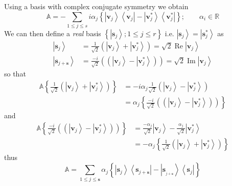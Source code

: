 \documentclass[aps,preprint]{revtex4}%
\begin{document}
Using a basis with complex conjugate symmetry we obtain
\begin{equation}
\mathbb{A}=-\sum_{1\leq j\leq s}i\alpha_{j}\left\{  \left\vert \mathbf{v}%
_{j}\right\rangle \left\langle \mathbf{v}_{j}\right\vert -\left\vert
\mathbf{v}_{j}^{\ast}\right\rangle \left\langle \mathbf{v}_{j}^{\ast
}\right\vert \right\}  ;\qquad\alpha_{i}\in\mathbb{R}%
\end{equation}
We can then define a \emph{real} basis $\left\{  \left\vert \mathbf{s}%
_{j}\right\rangle ;1\leq j\leq r\right\}  $ i.e. $\left\vert \mathbf{s}%
_{j}\right\rangle =\left\vert \mathbf{s}_{j}^{\ast}\right\rangle $ as
\begin{align}
\left\vert \mathbf{s}_{j}\right\rangle  &  =\frac{1}{\sqrt{2}}\left(
\left\vert \mathbf{v}_{j}\right\rangle +\left\vert \mathbf{v}_{j}^{\ast
}\right\rangle \right)  =\sqrt{2}\operatorname{Re}\left\vert \mathbf{v}%
_{j}\right\rangle \nonumber\\
\left\vert \mathbf{s}_{j+\mathbf{s}}\right\rangle  &  =\frac{-i}{\sqrt{2}%
}\left(  \left(  \left\vert \mathbf{v}_{j}\right\rangle -\left\vert
\mathbf{v}_{j}^{\ast}\right\rangle \right)  \right)  =\sqrt{2}%
\operatorname{Im}\left\vert \mathbf{v}_{j}\right\rangle
\end{align}
so that
\begin{align}
\mathbb{A}\left\{  \frac{1}{\sqrt{2}}\left(  \left\vert \mathbf{v}%
_{j}\right\rangle +\left\vert \mathbf{v}_{j}^{\ast}\right\rangle \right)
\right\}   &  =-i\alpha_{j}\frac{1}{\sqrt{2}}\left(  \left\vert \mathbf{v}%
_{j}\right\rangle -\left\vert \mathbf{v}_{j}^{\ast}\right\rangle \right)
\nonumber\\
&  =\alpha_{j}\left\{  \frac{-i}{\sqrt{2}}\left(  \left(  \left\vert
\mathbf{v}_{j}\right\rangle -\left\vert \mathbf{v}_{j}^{\ast}\right\rangle
\right)  \right)  \right\}
\end{align}
and
\begin{align}
\mathbb{A}\left\{  \frac{-i}{\sqrt{2}}\left(  \left(  \left\vert
\mathbf{v}_{j}\right\rangle -\left\vert \mathbf{v}_{j}^{\ast}\right\rangle
\right)  \right)  \right\}   &  =\frac{-\alpha_{j}}{\sqrt{2}}\left\vert
\mathbf{v}_{j}\right\rangle -\frac{\alpha_{j}}{\sqrt{2}}\left\vert
\mathbf{v}_{j}^{\ast}\right\rangle \nonumber\\
&  =-\alpha_{j}\left\{  \frac{1}{\sqrt{2}}\left(  \left\vert \mathbf{v}%
_{j}\right\rangle +\left\vert \mathbf{v}_{j}^{\ast}\right\rangle \right)
\right\}
\end{align}
thus
\begin{equation}
\mathbb{A=}\sum_{1\leq j\leq\mathbf{s}}\alpha_{j}\left\{  \left\vert
\mathbf{s}_{j}\right\rangle \left\langle \mathbf{s}_{j+\mathbf{s}}\right\vert
-\left\vert \mathbf{s}_{_{j+\mathbf{s}}}\right\rangle \left\langle
\mathbf{s}_{j}\right\vert \right\}
\end{equation}
\end{document}
